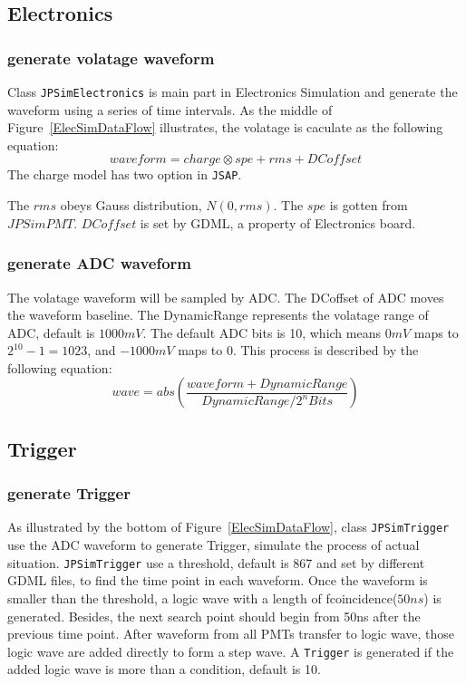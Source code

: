 \subsection{Electronics}
\subsubsection{generate volatage waveform}
Class \texttt{JPSimElectronics} is main part in Electronics Simulation and generate the waveform using a series of time intervals.
As the middle of Figure~\ref{ElecSimDataFlow} illustrates, the volatage is caculate as the following equation:
\[waveform=charge\otimes spe+rms+DCoffset\]
The charge model has two option in \texttt{JSAP}.

The $rms$ obeys Gauss distribution, $N(0, rms)$. The $spe$ is gotten from $JPSimPMT$. $DCoffset$ is set by GDML, a property of Electronics board.
\subsubsection{generate ADC waveform}
The volatage waveform will be sampled by ADC. The DCoffset of ADC moves the waveform baseline. The DynamicRange represents the volatage range of ADC, default
is $1000mV$. The default ADC bits is 10, which means $0mV$ maps to $2^10-1=1023$, and $-1000mV$ maps to $0$. This process is described by the following equation:
\[wave=abs(\frac{waveform+DynamicRange}{DynamicRange/2^nBits})\]

\subsection{Trigger}
\subsubsection{generate Trigger}
As illustrated by the bottom of Figure~\ref{ElecSimDataFlow}, class \texttt{JPSimTrigger} use the ADC waveform to generate Trigger, simulate the process of actual 
situation. \texttt{JPSimTrigger} use a threshold, default is 867 and set by different GDML files, to find the time point in each waveform. Once the waveform is smaller 
than the threshold, a logic wave with a length of fcoincidence($50ns$) is generated. Besides, the next search point should begin from 50ns after the previous time point.
After waveform from all PMTs transfer to logic wave, those logic wave are added directly to form a step wave.
A \texttt{Trigger} is generated if the added logic wave is more than a condition, default is 10.
